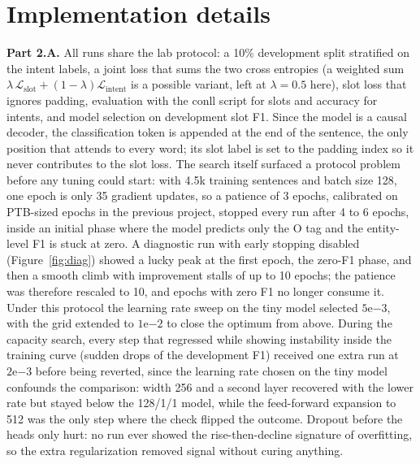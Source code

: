 \documentclass[a4paper]{article}
\begin{document}
\section{Implementation details}
\textbf{Part 2.A.} All runs share the lab protocol: a 10\% development split stratified on the intent labels, a joint loss that sums the two cross entropies (a weighted sum $\lambda\,\mathcal{L}_{\text{slot}}+(1-\lambda)\mathcal{L}_{\text{intent}}$ is a possible variant, left at $\lambda{=}0.5$ here), slot loss that ignores padding, evaluation with the conll script for slots and accuracy for intents, and model selection on development slot F1. Since the model is a causal decoder, the classification token is appended at the end of the sentence, the only position that attends to every word; its slot label is set to the padding index so it never contributes to the slot loss. The search itself surfaced a protocol problem before any tuning could start: with 4.5k training sentences and batch size 128, one epoch is only 35 gradient updates, so a patience of 3 epochs, calibrated on PTB-sized epochs in the previous project, stopped every run after 4 to 6 epochs, inside an initial phase where the model predicts only the O tag and the entity-level F1 is stuck at zero. A diagnostic run with early stopping disabled (Figure~\ref{fig:diag}) showed a lucky peak at the first epoch, the zero-F1 phase, and then a smooth climb with improvement stalls of up to 10 epochs; the patience was therefore rescaled to 10, and epochs with zero F1 no longer consume it. Under this protocol the learning rate sweep on the tiny model selected $5\mathrm{e}{-3}$, with the grid extended to $1\mathrm{e}{-2}$ to close the optimum from above. During the capacity search, every step that regressed while showing instability inside the training curve (sudden drops of the development F1) received one extra run at $2\mathrm{e}{-3}$ before being reverted, since the learning rate chosen on the tiny model confounds the comparison: width 256 and a second layer recovered with the lower rate but stayed below the 128/1/1 model, while the feed-forward expansion to 512 was the only step where the check flipped the outcome. Dropout before the heads only hurt: no run ever showed the rise-then-decline signature of overfitting, so the extra regularization removed signal without curing anything.
\end{document}
